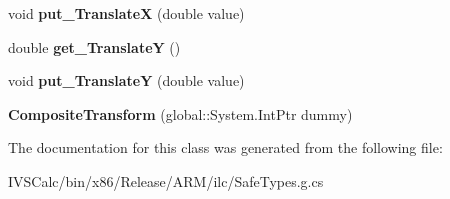 \begin{DoxyCompactItemize}
void {\bfseries put\+\_\+\+TranslateX} (double value)
\item 
\mbox{\label{class_windows_1_1_u_i_1_1_xaml_1_1_media_1_1_composite_transform_af72efd7ff2c42a47a3149a370ca41465}} 
double {\bfseries get\+\_\+\+TranslateY} ()
\item 
\mbox{\label{class_windows_1_1_u_i_1_1_xaml_1_1_media_1_1_composite_transform_a9684ba6d34e8ae06becea6cc9a4fb220}} 
void {\bfseries put\+\_\+\+TranslateY} (double value)
\item 
\mbox{\label{class_windows_1_1_u_i_1_1_xaml_1_1_media_1_1_composite_transform_a4aa17b7ceef5b62b3292a4dfe73c2323}} 
{\bfseries Composite\+Transform} (global\+::\+System.\+Int\+Ptr dummy)
\end{DoxyCompactItemize}


The documentation for this class was generated from the following file\+:\begin{DoxyCompactItemize}
\item 
I\+V\+S\+Calc/bin/x86/\+Release/\+A\+R\+M/ilc/Safe\+Types.\+g.\+cs\end{DoxyCompactItemize}
